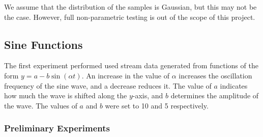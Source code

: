 \documentclass[a4paper,11pt]{article}
\begin{document}
  We assume that the distribution of the samples is Gaussian, but this may not be
  the case. However, full non-parametric testing is out of the scope of this project.
\subsection{Sine Functions}
\label{sec-8-1}

   The first experiment performed used stream data generated from functions of
   the form $y=a-b\sin(\alpha t)$. An increase in the value of $\alpha$
   increases the oscillation frequency of the sine wave, and a decrease reduces
   it. The value of $a$ indicates how much the wave is shifted along the
   $y$-axis, and $b$ determines the amplitude of the wave. The values of $a$ and
   $b$ were set to 10 and 5 respectively.
\subsubsection{Preliminary Experiments}
\label{sec-8-1-1}
\end{document}
